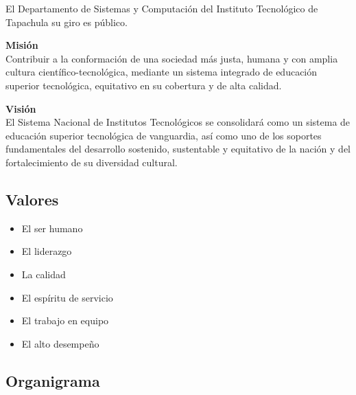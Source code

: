 El Departamento de Sistemas y Computación del Instituto Tecnológico de Tapachula su giro es público.\\


\parbox[t]{0.48\textwidth}{
{\setlength{\baselineskip}{1.5\baselineskip}
\textbf{Misión}\\
Contribuir a la conformación de una sociedad más justa, humana y con amplia cultura científico-tecnológica, mediante un sistema integrado de educación superior tecnológica, equitativo en su cobertura y de alta calidad.\par}
}\hfill
\parbox[t]{0.48\textwidth}{
{\setlength{\baselineskip}{1.3\baselineskip}
\textbf{Visión}\\
El Sistema Nacional de Institutos Tecnológicos se consolidará como un sistema de educación superior tecnológica de vanguardia, así como uno de los soportes fundamentales del desarrollo sostenido, sustentable y equitativo de la nación y del fortalecimiento de su diversidad cultural.\par}
}
\newpage
\subsection*{Valores}
\begin{multicols}{3}
\begin{itemize}
\item El ser humano
\item El liderazgo
\item La calidad
\item El espíritu de servicio
\item El trabajo en equipo
\item El alto desempeño
\end{itemize}
\end{multicols}

\subsection*{Organigrama}


